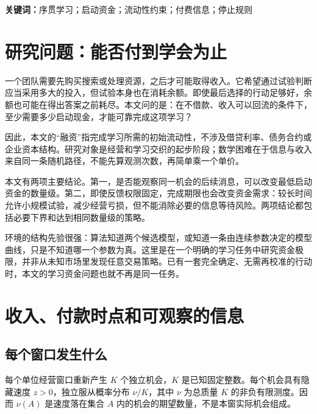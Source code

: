 \begin{abstract}
当每次试验必须先付款、成功收入又能继续使用时，完成学习所需的观测次数并不直接等于必须准备的启动资金。本文研究这一流动性约束如何影响行动选择。每个经营窗口有固定数量的单位奖励机会，投入强度连续可调，算法必须在余额允许的条件下学习并输出接近真实最优的投入。我们构造历史收入读数和若干暴露矩完全相同的环境，比较仅能观察首次成功与可以付费观察同一身份后续消息的两种权限。结果给出不同数量级的最低启动资金，以及首次反馈下资金与完成期限的匹配关系。重复消息的费用计入现金支出；允许不购买，因此更丰富的权限不会使最优策略变差。证明把完整日志的信息上界与实际付款路径联结，而非把平均亏损直接当作现金下界。一个固定机会池案例实际执行连续参数估计、逐窗付款、付费反馈和提前停止。结论限于已知模型模板下的基本极限；全部数值数据为合成，不代表真实市场验证。
\end{abstract}
\noindent\textbf{关键词：}序贯学习；启动资金；流动性约束；付费信息；停止规则

\section{研究问题：能否付到学会为止}
一个团队需要先购买搜索或处理资源，之后才可能取得收入。它希望通过试验判断应当采用多大的投入，但试验本身也在消耗余额。即使最后选择的行动足够好，余额也可能在得出答案之前耗尽。本文问的是：在不借款、收入可以回流的条件下，至少需要多少启动现金，才能可靠完成这项学习？

因此，本文的“融资”指完成学习所需的初始流动性，不涉及借贷利率、债务合约或企业资本结构。研究对象是经营和学习交织的起步阶段；数学困难在于信息与收入来自同一条随机路径，不能先算观测次数，再简单乘一个单价。

本文有两项主要结论。第一，是否能观察同一机会的后续消息，可以改变最低启动资金的数量级。第二，即使反馈权限固定，完成期限也会改变资金需求：较长时间允许小规模试验，减少经营亏损，但不能消除必要的信息等待风险。两项结论都包括必要下界和达到相同数量级的策略。

环境的结构先验很强：算法知道两个候选模型，或知道一条由连续参数决定的模型曲线，只是不知道哪一个参数为真。这里是在一个明确的学习任务中研究资金极限，并非从未知市场里发现任意交易策略。已有一套完全确定、无需再校准的行动时，本文的学习资金问题也就不再是同一任务。

\section{收入、付款时点和可观察的信息}
\subsection{每个窗口发生什么}
每个单位经营窗口重新产生 $K$ 个独立机会，$K$ 是已知固定整数。每个机会具有隐藏速度 $z>0$，独立服从概率分布 $\nu/K$，其中 $\nu$ 为总质量 $K$ 的非负有限测度。因而 $\nu(A)$ 是速度落在集合 $A$ 内的机会的期望数量，不是本窗实际机会组成。

